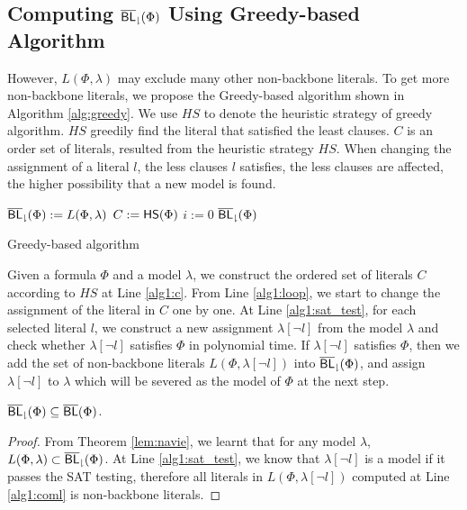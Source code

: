 \medskip

\subsection{Computing ${\sf \overline{BL}_\downharpoonright}(\Phi)$ Using Greedy-based Algorithm}

However, $L(\Phi,\lambda)$ may exclude many other non-backbone literals.
To get more non-backbone literals, we propose the Greedy-based algorithm shown in Algorithm \ref{alg:greedy}. We use $HS$ to denote the heuristic strategy of greedy algorithm. $HS$ greedily find the literal that satisfied the least clauses. 
$C$ is an order set of literals, resulted from the heuristic strategy $HS$.
When changing the assignment of a literal $l$, the less clauses $l$ satisfies, the less clauses are affected, the higher possibility that a new model is found.

\begin{algorithm2e}
\SetAlgoShortEnd
\SetFillComment
{}
${\sf \overline{BL}_\downharpoonright}(\Phi):=L(\Phi,\lambda)$\; \label{alg1:init}
$C:={\sf HS}(\Phi)$\; \label{alg1:c}
$i:=0$\;
\Return ${\sf \overline{BL}_\downharpoonright}(\Phi)$\;
\caption{Greedy-based algorithm}
\label{alg:greedy}
\end{algorithm2e}
Given a formula $\Phi$ and a model $\lambda$, we construct the ordered set of literals $C$ according to $HS$ at Line \ref{alg1:c}. From Line \ref{alg1:loop}, we start to change the assignment of the literal in $C$ one by one. At Line \ref{alg1:sat_test}, for each selected literal $l$, we construct a new assignment $\lambda[\neg l]$ from the model
$\lambda$ and check whether  $\lambda[\neg l]$ satisfies $\Phi$ in polynomial time. If $\lambda[\neg l]$ satisfies $\Phi$, then we add the set of non-backbone literals $L(\Phi,\lambda[\neg l])$ into ${\sf \overline{BL}_\downharpoonright}(\Phi)$, and
assign $\lambda[\neg l]$ to $\lambda$ which will be severed as the model of $\Phi$ at the next step.

\begin{theorem}
${\sf \overline{BL}_\downharpoonright}(\Phi)\subseteq\overline{\textsf{BL}}(\Phi)$.
\end{theorem}

\begin{proof}
From Theorem \ref{lem:navie}, we learnt that for any model $\lambda$, $L(\Phi,\lambda)\subset{\sf \overline{BL}_\downharpoonright}(\Phi)$. At Line \ref{alg1:sat_test}, we know that $\lambda[\neg l]$ is a model if it passes the SAT testing, therefore all literals in $L(\Phi,\lambda[\neg l])$ computed at Line \ref{alg1:coml} is non-backbone literals.
\end{proof}

